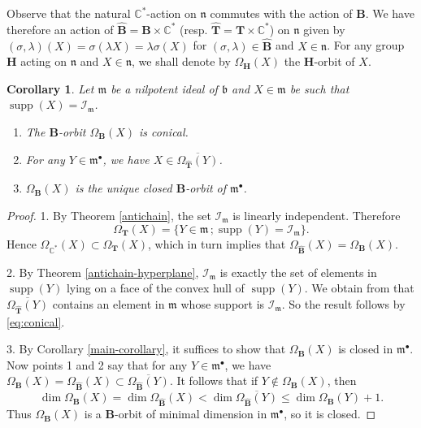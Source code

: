 \documentclass[10pt,a4paper]{amsart}
\newcommand{\supp}{\mathop{\mathrm{supp}}\nolimits}
\newcommand{\soc}[1]{\mathcal{I}_{#1}}
\newcommand{\group}[1]{\mathbf{#1}}
\numberwithin{equation}{section}
\theoremstyle{plain}
\newtheorem{corollary}[theorem]{Corollary}
\theoremstyle{definition}
\theoremstyle{remark}
\begin{document}
Observe that the natural $\mathbb{C}^{*}$-action on $\mathfrak{n}$
commutes with the action of $\group{B}$. We have therefore an action of 
$\widehat{\group{B}} = \group{B} \times \mathbb{C}^{*}$ 
(resp. $\widehat{\group{T}} = \group{T} \times \mathbb{C}^{*}$) 
on $\mathfrak{n}$ given by 
$(\sigma, \lambda ) (X) = \sigma (\lambda X) = \lambda \sigma (X)$
for $(\sigma, \lambda )\in \widehat{\group{B}}$ and $X\in\mathfrak{n}$.
For any group $\group{H}$ acting on $\mathfrak{n}$ and $X\in\mathfrak{n}$,
we shall denote by $\Omega_{\group{H}}(X)$ the $\group{H}$-orbit of $X$.

\begin{corollary}\label{description}
Let $\mathfrak{m}$ be a nilpotent ideal of $\mathfrak{b}$ and 
$X\in \mathfrak{m}$ be such that $\supp (X) = \soc{\mathfrak{m}}$.
\begin{enumerate}
\item The $\group{B}$-orbit $\Omega_{\group{B}}(X)$ is conical.
\item For any $Y\in\mathfrak{m}^{\bullet}$, we have
$X \in \overline{\Omega_{\widehat{\group{T}}} (Y)}$.
\item $\Omega_{\group{B}}(X)$ is the unique closed $\group{B}$-orbit of $\mathfrak{m}^{\bullet}$.
\end{enumerate}
\end{corollary}
\begin{proof}
1. By Theorem \ref{antichain}, the set $\soc{\mathfrak{m}}$ is linearly independent.
Therefore 
\begin{equation}\label{eq:conical}
\Omega_{\group{T}}(X) = \{ Y \in \mathfrak{m}\, ; \supp (Y) = \soc{\mathfrak{m}}\}.
\end{equation}
Hence $\Omega_{\mathbb{C}^{*}}( X )\subset \Omega_{\group{T}}(X)$, which in turn implies that 
$\Omega_{\widehat{\group{B}}} (X) = \Omega_{\group{B}}(X)$. 

2. By Theorem \ref{antichain-hyperplane}, $\soc{\mathfrak{m}}$ is exactly the set of elements in
$\supp (Y)$ lying on a face of the convex hull
of $\supp (Y)$. We obtain from \cite[Proposition 2.18]{C} that 
$\overline{\Omega_{\widehat{\group{T}}} (Y)}$ contains
an element in $\mathfrak{m}$ whose support is $\soc{\mathfrak{m}}$. 
So the result follows by \eqref{eq:conical}.

3. By Corollary \ref{main-corollary}, it suffices to show that $\Omega_{\group{B}} (X)$ is closed in 
$\mathfrak{m}^{\bullet}$. Now points 1 and 2 say that for any $Y\in\mathfrak{m}^{\bullet}$, we have
$
\Omega_{\group{B}}(X)  = \Omega_{\widehat{\group{B}}} (X) 
\subset  \overline{\Omega_{\widehat{\group{B}}} (Y)}.
$
It follows that if $Y\not\in \Omega_{\group{B}} (X)$, then 
$$
\dim \Omega_{\group{B}}(X) = \dim \Omega_{\widehat{\group{B}}} (X)
< \dim  \overline{\Omega_{\widehat{\group{B}}} (Y)} \leqslant \dim \Omega_{\group{B}}(Y) + 1.
$$
Thus $\Omega_{\group{B}}(X)$ is a $\group{B}$-orbit of minimal dimension in $\mathfrak{m}^{\bullet}$,
so it is closed.
\end{proof}
\end{document}
